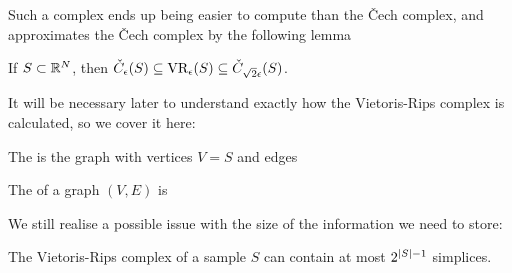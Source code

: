 \documentclass{article}
\begin{document}
Such a complex ends up being easier to compute than the \v{C}ech complex, and approximates the \v{C}ech complex by the following lemma

\begin{lemma}
	If $S \subset \mathbb{R}^N$, then $\check{C}_\epsilon(S) \subseteq \text{VR}_\epsilon(S) \subseteq \check{C}_{\sqrt{2}\epsilon}(S)$.
\end{lemma}

\begin{aside}
	It will be necessary later to understand exactly how the Vietoris-Rips complex is calculated, so we cover it here:
	\begin{definition}
		The  is the graph with vertices $V=S$ and edges 
	\end{definition}
\begin{definition}
	The  of a graph $(V,E)$ is 
\end{definition}
\end{aside}

We still realise a possible issue with the size of the information we need to store:

\begin{lemma}
	The Vietoris-Rips complex of a sample $S$ can contain at most $2^{\left\lvert S \right\rvert-1}$ simplices.  
\end{lemma}
\end{document}
